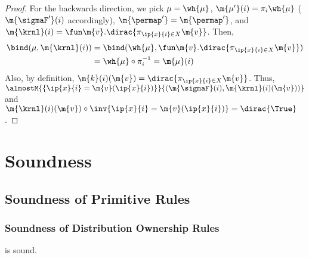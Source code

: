 \documentclass[acmsmall,nonacm,screen,appendix]{acmart}
\begin{document}
\begin{proof}
	For the backwards direction,
	we pick $\mu = \wh{\mu}$,
  $\m{\mu'}(i) = \pi_{i}\wh{\mu}$ ($\m{\sigmaF'}(i)$ accordingly),
  $\m{\permap'}=\m{\permap'}$,
	and $\m{\krnl}(i) = \fun \m{v}. \dirac{\pi_{\ip{x}{i} \in X} \m{v}}$.
Then,
\begin{align*}
		\bind(\mu, \m{\krnl}(i))
		&= \bind(\wh{\mu}, \fun \m{v}. \dirac{\pi_{\ip{x}{i} \in X} \m{v}})\\
		&= \wh{\mu} \circ \pi_i^{-1} = \m{\mu}(i)
	\end{align*}
Also, by definition,
	$\m{k}(i)(\m{v}) = \dirac{\pi_{\ip{x}{i} \in X} \m{v}}$.
Thus,
  $\almostM{\{\ip{x}{i} = \m{v}(\ip{x}{i})\}}{(\m{\sigmaF}(i), \m{\krnl}(i)(\m{v}))}$ and
  $\m{\krnl}(i)(\m{v}) \circ \inv{\ip{x}{i} = \m{v}(\ip{x}{i})} = \dirac{\True}$.
\end{proof}

 \section{Soundness}
\label{sec:appendix:soundness}

\subsection{Soundness of Primitive Rules}
\label{sec:appendix:primitive-rules}


\subsubsection{Soundness of Distribution Ownership Rules}
\begin{lemma}
\label{proof:and-to-star}
   is sound.
\end{lemma}
\end{document}
